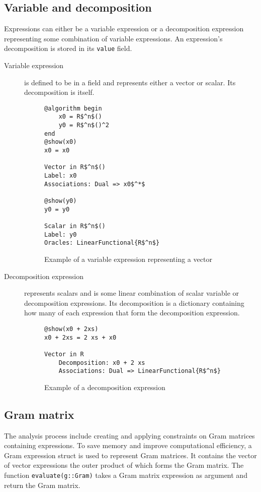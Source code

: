 \subsection*{Variable and decomposition}
Expressions can either be a variable expression or a decomposition expression representing some combination of variable expressions. An expression's decomposition is stored in its \texttt{value} field.
\begin{description}
	\item[Variable expression] is defined to be in a field and represents either a vector or scalar. Its decomposition is itself.
\begin{figure}[h]
		\begin{lstlisting}[mathescape]
@algorithm begin
	x0 = R$^n$()
	y0 = R$^n$()^2
end
@show(x0)
x0 = x0

Vector in R$^n$()
Label: x0
Associations: Dual => x0$^*$

@show(y0)
y0 = y0

Scalar in R$^n$()
Label: y0
Oracles: LinearFunctional{R$^n$}
		\end{lstlisting}
	
	\caption{Example of a variable expression representing a vector}
	\label{ex_variable}
\end{figure}
	\item[Decomposition expression] represents scalars and is some linear combination of scalar variable or decomposition expressions. Its decomposition is a dictionary containing how many of each expression that form the decomposition expression.

\begin{figure}[h]
		\begin{lstlisting}[mathescape]
@show(x0 + 2xs)
x0 + 2xs = 2 xs + x0

Vector in R
	Decomposition: x0 + 2 xs
	Associations: Dual => LinearFunctional{R$^n$}
		\end{lstlisting}
	\caption{Example of a decomposition expression}
	\label{ex_decomposition}
\end{figure}
\end{description}

\subsection*{Gram matrix}
The analysis process include creating and applying constraints on Gram matrices containing expressions. To save memory and improve computational efficiency, a Gram expression struct is used to represent Gram matrices. It contains the vector of vector expressions the outer product of which forms the Gram matrix. The function \texttt{evaluate(g::Gram)} takes a Gram matrix expression as argument and return the Gram matrix.

